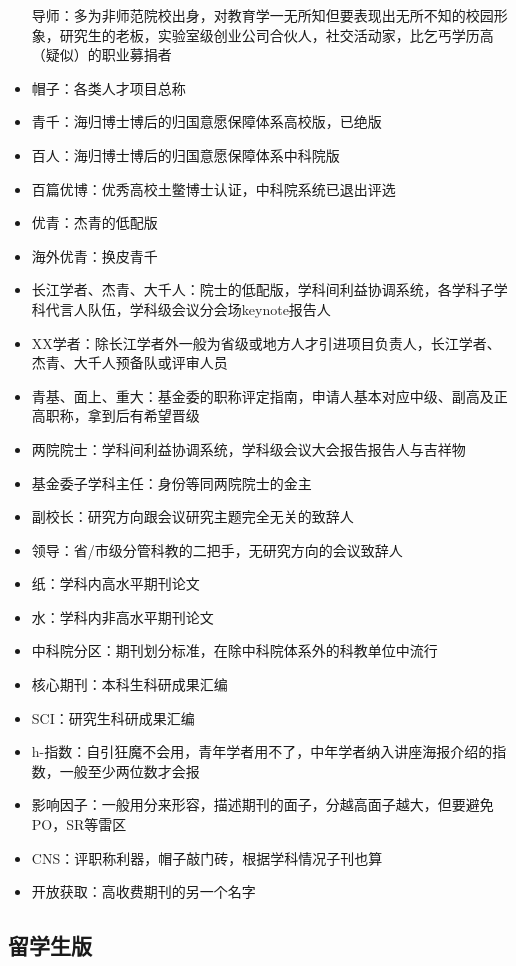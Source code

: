\documentclass[]{tufte-book}
\begin{document}
\begin{itemize}
  导师：多为非师范院校出身，对教育学一无所知但要表现出无所不知的校园形象，研究生的老板，实验室级创业公司合伙人，社交活动家，比乞丐学历高（疑似）的职业募捐者
\item
  帽子：各类人才项目总称
\item
  青千：海归博士博后的归国意愿保障体系高校版，已绝版
\item
  百人：海归博士博后的归国意愿保障体系中科院版
\item
  百篇优博：优秀高校土鳖博士认证，中科院系统已退出评选
\item
  优青：杰青的低配版
\item
  海外优青：换皮青千
\item
  长江学者、杰青、大千人：院士的低配版，学科间利益协调系统，各学科子学科代言人队伍，学科级会议分会场keynote报告人
\item
  XX学者：除长江学者外一般为省级或地方人才引进项目负责人，长江学者、杰青、大千人预备队或评审人员
\item
  青基、面上、重大：基金委的职称评定指南，申请人基本对应中级、副高及正高职称，拿到后有希望晋级
\item
  两院院士：学科间利益协调系统，学科级会议大会报告报告人与吉祥物
\item
  基金委子学科主任：身份等同两院院士的金主
\item
  副校长：研究方向跟会议研究主题完全无关的致辞人
\item
  领导：省/市级分管科教的二把手，无研究方向的会议致辞人
\item
  纸：学科内高水平期刊论文
\item
  水：学科内非高水平期刊论文
\item
  中科院分区：期刊划分标准，在除中科院体系外的科教单位中流行
\item
  核心期刊：本科生科研成果汇编
\item
  SCI：研究生科研成果汇编
\item
  h-指数：自引狂魔不会用，青年学者用不了，中年学者纳入讲座海报介绍的指数，一般至少两位数才会报
\item
  影响因子：一般用分来形容，描述期刊的面子，分越高面子越大，但要避免PO，SR等雷区
\item
  CNS：评职称利器，帽子敲门砖，根据学科情况子刊也算
\item
  开放获取：高收费期刊的另一个名字
\end{itemize}

\hypertarget{ux7559ux5b66ux751fux7248}{%
\subsection*{留学生版}\label{ux7559ux5b66ux751fux7248}}
\end{document}
